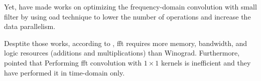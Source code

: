 Yet, \textcite{zeng_optimizing_nodate, chitsaz_acceleration_2020, liang_evaluating_2020} have made works on optimizing the frequency-domain convolution with small filter by using \acrfull{oad} technique \cite{w_smith_scientist_1997} to lower the number of operations and increase the data parallelism.

Desptite those works, according to \textcite{liang_evaluating_2020, podili_fast_2017}, \acrshort{fft} requires more memory, bandwidth, and logic resources (additions and multiplications) than Winograd. Furthermore, \textcite{zhang_caffeine_2016} pointed that Performing \acrshort{fft} convolution with $1 \times 1$ kernels is inefficient and they have performed it in time-domain only.
